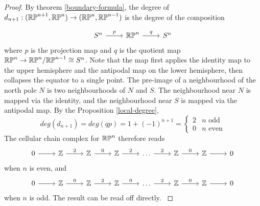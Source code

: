 \begin{proof}
By theorem \ref{boundary-formula}, the degree of $d_{n+1}:(\mathbb{RP}^{n+1},\mathbb{RP}^{n})\rightarrow (\mathbb{RP}^{n},\mathbb{RP}^{n-1})$ is the degree of the composition

\[\begin{tikzcd}
S^n \arrow[r, "p"] & \RP{n} \arrow[r, "q"] & S^n
\end{tikzcd}\]
where $p$ is the projection map and $q$ is the quotient map $\mathbb{RP}^{n}\rightarrow \mathbb{RP}^{n}/\mathbb{RP}^{n-1}\cong S^{n}$. Note that the map first applies the identity map to the upper hemisphere and the antipodal map on the lower hemisphere, then collapses the equator to a single point. The pre-image of a neighbourhood of the north pole $N$ is two neighbourhoods of $N$ and $S$. The neighbourhood near $N$ is mapped via the identity, and the neighbourhood near $S$ is mapped via the antipodal map. By the Proposition \ref{local-degree}, $$deg(d_{n+1})=deg(qp)=1+(-1)^{n+1}=\begin{cases}2 & n \text{ odd}\\0 & n\text{ even}\end{cases}$$
The cellular chain complex for $\mathbb{RP}^{n}$ therefore reads
\[\begin{tikzcd}
0 \arrow[r] & \mathbb{Z} \arrow[r, "2"] & \mathbb{Z} \arrow[r, "0"] & \mathbb{Z} \arrow[r, "2"] & \dots \arrow[r, "2"] & \mathbb{Z} \arrow[r, "0"] & \mathbb{Z} \arrow[r] & 0
\end{tikzcd}\]
when $n$ is even, and
\[\begin{tikzcd}
0 \arrow[r] & \mathbb{Z} \arrow[r, "0"] & \mathbb{Z} \arrow[r, "2"] & \mathbb{Z} \arrow[r, "0"] & \dots \arrow[r, "2"] & \mathbb{Z} \arrow[r, "0"] & \mathbb{Z} \arrow[r] & 0
\end{tikzcd}\]
when $n$ is odd. The result can be read off directly.
\cite{Hatcher}
\end{proof}
